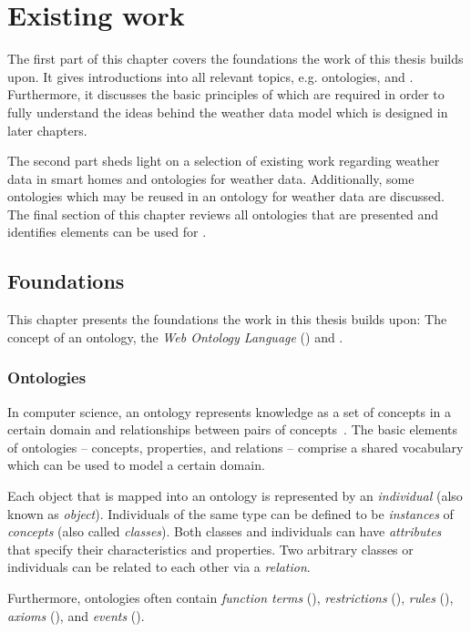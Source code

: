 \chapter{Existing work}
\label{ch:existing_work}

The first part of this chapter covers the foundations the work of this thesis builds upon. It gives introductions into all relevant topics, e.g. ontologies,  and . Furthermore, it discusses the basic principles of \thinkhome which are required in order to fully understand the ideas behind the weather data model which is designed in later chapters.

The second part sheds light on a selection of existing work regarding weather data in smart homes and ontologies for weather data. Additionally, some ontologies which may be reused in an ontology for weather data are discussed. The final section of this chapter reviews all ontologies that are presented and identifies elements can be used for \thinkhome.

\section{Foundations}

This chapter presents the foundations the work in this thesis builds upon: The concept of an ontology, the \emph{Web Ontology Language} () and \thinkhome.

\subsection{Ontologies}
\label{subsec:ontologies}

In computer science, an ontology represents knowledge as a set of concepts in a certain domain and relationships between pairs of concepts~\cite{OntologiesSilverBullet}. The basic elements of ontologies -- concepts, properties, and relations -- comprise a shared vocabulary which can be used to model a certain domain.

Each object that is mapped into an ontology is represented by an \emph{individual} (also known as \emph{object}). Individuals of the same type can be defined to be \emph{instances} of \emph{concepts} (also called \emph{classes}). Both classes and individuals can have \emph{attributes} that specify their characteristics and properties. Two arbitrary classes or individuals can be related to each other via a \emph{relation}.

Furthermore, ontologies often contain \emph{function terms} (), \emph{restrictions} (), \emph{rules} (), \emph{axioms} (), and \emph{events} ().

